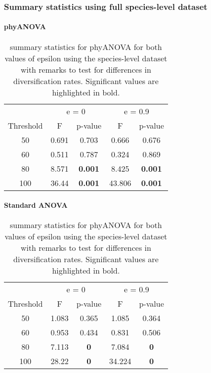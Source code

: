 \documentclass[]{article}
\let\oldparagraph\paragraph
\renewcommand{\paragraph}[1]{\oldparagraph{#1}\mbox{}}
\begin{document}
\hypertarget{summary-statistics-using-full-species-level-dataset}{%
\subsubsection{Summary statistics using full species-level
dataset}\label{summary-statistics-using-full-species-level-dataset}}

\hypertarget{phyanova-2}{%
\paragraph{phyANOVA}\label{phyanova-2}}

\begin{table}[H]

\caption{\label{tab:unnamed-chunk-12}summary statistics for phyANOVA for both values of epsilon using the species-level dataset with remarks to test for differences in diversification rates. Significant values are highlighted in bold.}
\centering
\begin{tabular}{c|c|c|c|c}
\hline
\multicolumn{1}{c|}{ } & \multicolumn{2}{c|}{e = 0} & \multicolumn{2}{c}{e = 0.9} \\
\cline{2-3} \cline{4-5}
Threshold & F & p-value & F & p-value\\
\hline
50 & 0.691 & 0.703 & 0.666 & 0.676\\
\hline
60 & 0.511 & 0.787 & 0.324 & 0.869\\
\hline
80 & 8.571 & \textbf{0.001} & 8.425 & \textbf{0.001}\\
\hline
100 & 36.44 & \textbf{0.001} & 43.806 & \textbf{0.001}\\
\hline
\end{tabular}
\end{table}

\hypertarget{standard-anova-2}{%
\paragraph{Standard ANOVA}\label{standard-anova-2}}

\begin{table}[H]

\caption{\label{tab:unnamed-chunk-13}summary statistics for phyANOVA for both values of epsilon using the species-level dataset with remarks to test for differences in diversification rates. Significant values are highlighted in bold.}
\centering
\begin{tabular}{c|c|c|c|c}
\hline
\multicolumn{1}{c|}{ } & \multicolumn{2}{c|}{e = 0} & \multicolumn{2}{c}{e = 0.9} \\
\cline{2-3} \cline{4-5}
Threshold & F & p-value & F & p-value\\
\hline
50 & 1.083 & 0.365 & 1.085 & 0.364\\
\hline
60 & 0.953 & 0.434 & 0.831 & 0.506\\
\hline
80 & 7.113 & \textbf{0} & 7.084 & \textbf{0}\\
\hline
100 & 28.22 & \textbf{0} & 34.224 & \textbf{0}\\
\hline
\end{tabular}
\end{table}
\end{document}
